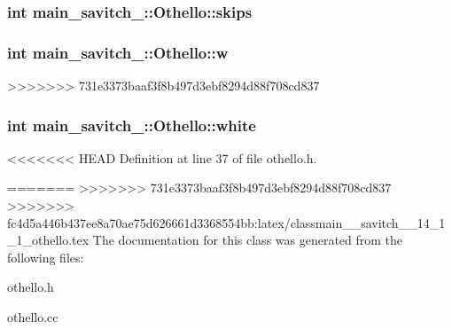 \subsubsection[{\texorpdfstring{skips}{skips}}]{\setlength{\rightskip}{0pt plus 5cm}int main\+\_\+savitch\+\_\+::\+Othello\+::skips\hspace{0.3cm}{\ttfamily [protected]}}\hypertarget{classmain__savitch__14_1_1_othello_a85d4ce17512d8dbf85a313a27eea0644}{}\label{classmain__savitch__14_1_1_othello_a85d4ce17512d8dbf85a313a27eea0644}
\subsubsection[{\texorpdfstring{w}{w}}]{\setlength{\rightskip}{0pt plus 5cm}int main\+\_\+savitch\+\_\+::\+Othello\+::w\hspace{0.3cm}{\ttfamily [protected]}}\hypertarget{classmain__savitch__14_1_1_othello_a1b11c5fe33e30a94ed39e8cb55caf37e}{}\label{classmain__savitch__14_1_1_othello_a1b11c5fe33e30a94ed39e8cb55caf37e}
>>>>>>> 731e3373baaf3f8b497d3ebf8294d88f708cd837
\subsubsection[{\texorpdfstring{white}{white}}]{\setlength{\rightskip}{0pt plus 5cm}int main\+\_\+savitch\+\_\+::\+Othello\+::white\hspace{0.3cm}{\ttfamily [protected]}}\hypertarget{classmain__savitch__14_1_1_othello_a7d5f59b1e581ed7a8145debeecf4f310}{}\label{classmain__savitch__14_1_1_othello_a7d5f59b1e581ed7a8145debeecf4f310}


<<<<<<< HEAD
Definition at line 37 of file othello.\+h.



=======
>>>>>>> 731e3373baaf3f8b497d3ebf8294d88f708cd837
>>>>>>> fc4d5a446b437ee8a70ae75d626661d3368554bb:latex/classmain__savitch__14_1_1_othello.tex
The documentation for this class was generated from the following files\+:\begin{DoxyCompactItemize}
\item 
othello.\+h\item 
othello.\+cc\end{DoxyCompactItemize}
